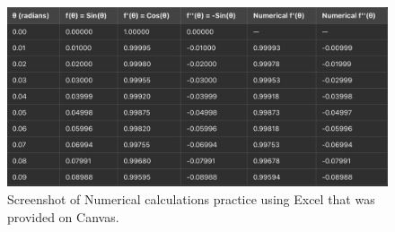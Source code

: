 \documentclass[idxtotoc,hyperref,openany]{labbook} %
\begin{document}
\newpage
{}
\begin{figure}[H] %
\begin{center}
\includegraphics[width=1.2\linewidth]{images/Lab.04/Lab04NumericalPractice.png}
\end{center}
\caption{Screenshot of Numerical calculations practice using Excel that was provided on Canvas.}
\label{fig:Lab04-NumericalPractice}
\end{figure}
\end{document}
